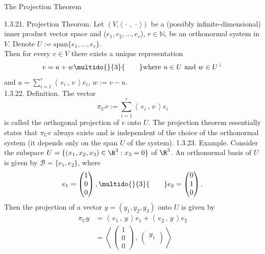 \documentclass[smaller,hyperref={CJKbookmarks=true}]{beamer}
\newcommand{\N}{\mathbb{N}}
\newcommand{\myseries}[2]{$#1_1,#1_2,\dots,#1_#2$}
\newcommand{\scp}[2]{\left\langle\,#1\,,\,#2\,\right\rangle} \newcommand{\scpp}{\langle\,\cdot\,,\,\cdot\,\rangle}
\begin{document}
\begin{frame}{The Projection Theorem}
\begin{spacing}{1}
\alert{1.3.21. Projection Theorem.} Let $(V,\scpp)$ be a (possibly infinite-dimensional) inner product vector space and (\myseries{e}{r}), $r\in\N$, be an orthonormal system in $V$. Denote $U:=\text{span}\{e_1,\ldots,e_r\}.$\\
Then for every $v\in V$ there exists a unique representation
\begin{equation*}
  v=u+w\multido{}{3}{\qquad}\text{where}~u\in U~\text{and}~w\in U^{\perp}
\end{equation*}
and $u=\sum\limits_{i=1}^{r}\scp{e_i}{v}e_i,\,w:=v-u.$\\
\alert{1.3.22. Definition.} The vector
\begin{equation*}
  \pi_Uv:=\sum_{i=1}^{r}\scp{e_i}{v}e_i
\end{equation*}
is called the orthogonal projection of $v$ onto $U$. The projection theorem
essentially states that $\pi_Uv$ always exists and is independent of the choice
of the orthonormal system (it depends only on the span $U$ of the system).
\newpage
\alert{1.3.23. Example.} Consider the subspace $U=\{(x_1,x_2,x_3)\in\R^3:x_3=0\}$ of $\R^3$. An orthonormal basis of $U$ is given by $\mathcal{B}=\{e_1,e_2\}$, where
\[e_1=\begin{pmatrix}
        1 \\
        0 \\
        0
      \end{pmatrix},\multido{}{3}{\qquad}e_2=\begin{pmatrix}
                                               0 \\
                                               1 \\
                                               0
                                             \end{pmatrix}.\]
Then the projection of a vector $y=(y_1,y_2,y_3)$ onto $U$ is given by
\begin{align*}
  \pi_Uy &=\scp{e_1}{y}e_1+\scp{e_2}{y}e_2  \\
   &=\scp{\begin{pmatrix}
            1 \\
            0 \\
            0
          \end{pmatrix}}{\begin{pmatrix}
                           y_1 \\

\end{pmatrix}}
\end{align*}
\end{spacing}
\end{frame}
\end{document}
